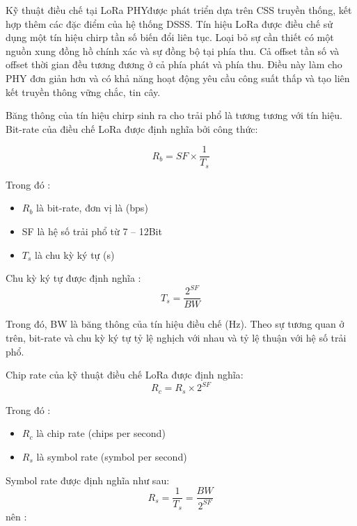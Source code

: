 \documentclass{article} %
\begin{document}
	Kỹ thuật điều chế tại LoRa PHY\cite{semtech2015an1200}được phát triển dựa trên CSS truyền thống, kết hợp thêm các đặc điểm của hệ thống DSSS. Tín hiệu LoRa được điều chế sử dụng một tín hiệu chirp tần số biến đổi liên tục. Loại bỏ sự cần thiết có một nguồn xung đồng hồ chính xác và sự đồng bộ tại phía thu. Cả offset tần số và offset thời gian đều tương đương ở cả phía phát và phía thu. Điều này làm cho PHY đơn giản hơn và có khả năng hoạt động yêu cầu công suất thấp và tạo liên kết truyền thông vững chắc, tin cây.
	
	Băng thông của tín hiệu chirp sinh ra cho trải phổ là tương tương với tín hiệu. Bit-rate của điều chế LoRa được định nghĩa bởi công thức\cite{semtech2015an1200}:
	
	\begin{equation} \label{Bit_rate}
		R_b=S F \times \frac{1}{T_s}
	\end{equation}
	
	Trong đó :
	\begin{itemize}
		\item $R_b$ là bit-rate, đơn vị là (bps)
		\item SF là hệ số trải phổ từ 7 – 12Bit
		\item $T_s$  là chu kỳ ký tự (s)
	\end{itemize}
	
	Chu kỳ ký tự được định nghĩa\cite{semtech2015an1200} :
	\begin{equation} \label{Cycle_symbol}
		T_s=\frac{2^{S F}}{B W}
	\end{equation}
	
	Trong đó, BW là băng thông của tín hiệu điều chế (Hz). Theo sự tương quan ở trên, bit-rate và chu kỳ ký tự tỷ lệ nghịch với nhau và tỷ lệ thuận với hệ số trải phổ.
	
	Chip rate của kỹ thuật điều chế LoRa được định nghĩa\cite{semtech2015an1200}:
	\begin{equation} \label{Chip_rate}
		R_c=R_s \times{2^{S F}}
	\end{equation}
	
	Trong đó :
	\begin{itemize}
		\item $R_c$ là chip rate (chips per second)
		\item $R_s$  là symbol rate (symbol per second)
	\end{itemize}
	
	Symbol rate được định nghĩa như sau\cite{semtech2015an1200}:
	\begin{equation} \label{symbol_rate}
		R_s=\frac{1}{T_s}=\frac{B W}{2^{S F}}
	\end{equation}
	nên : 
	
\end{document}
